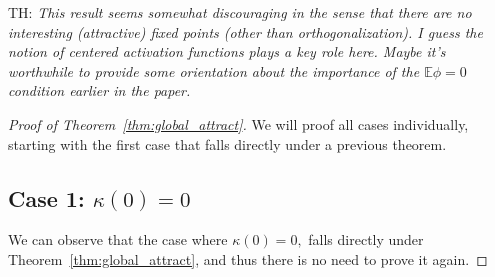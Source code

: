 \documentclass[twoside]{article}
\newcommand{\E}{\mathbb{E}}
\theoremstyle{definition}
\newcommand{\thomas}[1]{{\color{blue}TH:  \textit{#1}}}
\begin{document}
\thomas{This result seems somewhat discouraging in the sense that there are no interesting (attractive) fixed points (other than orthogonalization). I guess the notion of centered activation functions plays a key role here. Maybe it's worthwhile to provide some orientation about the importance of the $\E\phi=0$ condition earlier in the paper.}


\begin{proof}[Proof of Theorem~\ref{thm:global_attract}]
We will proof all cases individually, starting with the first case that falls directly under a previous theorem. 

\subsection*{Case 1: $\kappa(0)=0$}
We can observe that the case where $\kappa(0)=0,$ falls directly under Theorem~\ref{thm:global_attract}, and thus there is no need to prove it again.


\end{proof}
\end{document}
